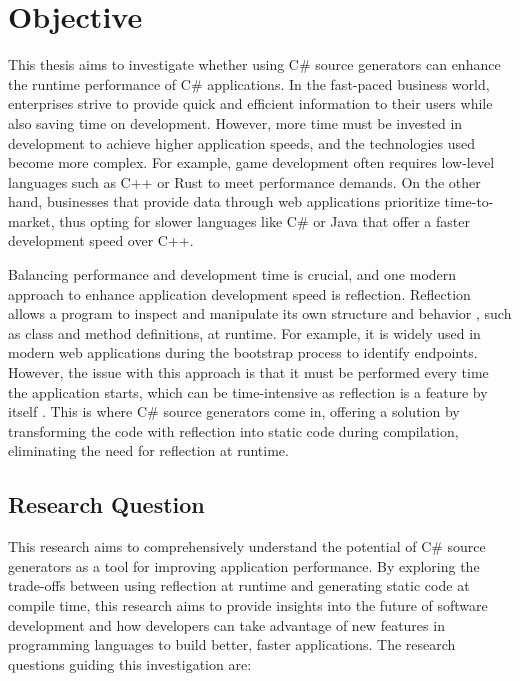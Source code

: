 \chapter{Objective}

This thesis aims to investigate whether using C\# source generators can enhance the runtime performance of C\# applications. In the fast-paced business world, enterprises strive to provide quick and efficient information to their users while also saving time on development. However, more time must be invested in development to achieve higher application speeds, and the technologies used become more complex. For example, game development often requires low-level languages such as C++ or Rust to meet performance demands. On the other hand, businesses that provide data through web applications prioritize time-to-market, thus opting for slower languages like C\# or Java that offer a faster development speed over C++.

Balancing performance and development time is crucial, and one modern approach to enhance application development speed is reflection. Reflection allows a program to inspect and manipulate its own structure and behavior \cite{Draheim2005GenerativeC}, such as class and method definitions, at runtime. For example, it is widely used in modern web applications during the bootstrap process to identify endpoints. However, the issue with this approach is that it must be performed every time the application starts, which can be time-intensive as reflection is a feature by itself \cite{Dragan2005PerformanceComputing}. This is where C\# source generators come in, offering a solution by transforming the code with reflection into static code during compilation, eliminating the need for reflection at runtime.

\section{Research Question}

This research aims to comprehensively understand the potential of C\# source generators as a tool for improving application performance. By exploring the trade-offs between using reflection at runtime and generating static code at compile time, this research aims to provide insights into the future of software development and how developers can take advantage of new features in programming languages to build better, faster applications. The research questions guiding this investigation are:

